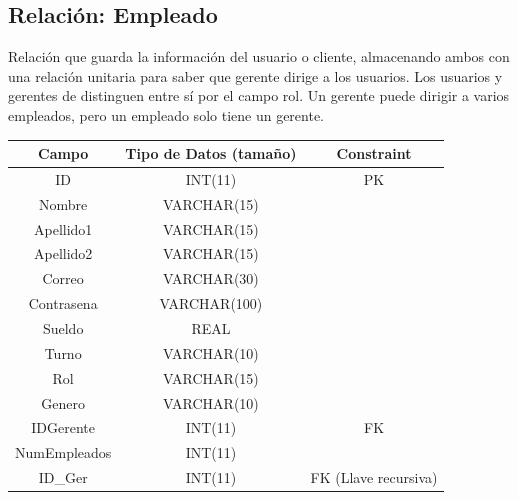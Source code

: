 \documentclass[12pt, fleqn]{report}                             %
\begin{document}
        \clearpage
        \subsection*{Relación: Empleado}

            Relación que guarda la información del usuario o cliente, almacenando ambos
            con una relación unitaria para saber que gerente dirige a los usuarios.
            Los usuarios y gerentes de distinguen entre sí por el campo rol.
            Un gerente puede dirigir a varios empleados, pero un empleado solo tiene un gerente.

            \vspace{2em}

            \small{
            \begin{tabular}{| c | c | c |}
                \hline
                \textbf{Campo} & \textbf{Tipo de Datos (tamaño)} & \textbf{Constraint} \\[0.5ex] 
                \hline\hline
                
                ID          & INT(11)       & PK                    \\
                Nombre      & VARCHAR(15)   &                       \\
                Apellido1   & VARCHAR(15)   &                       \\
                Apellido2   & VARCHAR(15)   &                       \\
                Correo      & VARCHAR(30)   &                       \\
                Contrasena  & VARCHAR(100)  &                       \\
                Sueldo      & REAL          &                       \\
                Turno       & VARCHAR(10)   &                       \\
                Rol         & VARCHAR(15)   &                       \\
                Genero      & VARCHAR(10)   &                       \\
                IDGerente   & INT(11)       & FK                    \\
                NumEmpleados& INT(11)       &                       \\
                ID\_Ger     & INT(11)       & FK (Llave recursiva)  \\
                \hline
            \end{tabular}
            }
\end{document}
